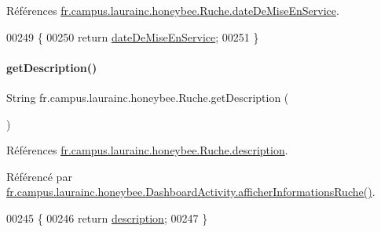 Références \hyperlink{classfr_1_1campus_1_1laurainc_1_1honeybee_1_1_ruche_aba813c622e2de609b22d7d752da2c544}{fr.\+campus.\+laurainc.\+honeybee.\+Ruche.\+date\+De\+Mise\+En\+Service}.


\begin{DoxyCode}
00249                                            \{
00250         \textcolor{keywordflow}{return} \hyperlink{classfr_1_1campus_1_1laurainc_1_1honeybee_1_1_ruche_aba813c622e2de609b22d7d752da2c544}{dateDeMiseEnService};
00251     \}
\end{DoxyCode}
\mbox{\label{classfr_1_1campus_1_1laurainc_1_1honeybee_1_1_ruche_ade21eb84d2a34d71cc2e89134b79cfd2}} 
\paragraph{\texorpdfstring{get\+Description()}{getDescription()}}
{\footnotesize\ttfamily String fr.\+campus.\+laurainc.\+honeybee.\+Ruche.\+get\+Description (\begin{DoxyParamCaption}{ }\end{DoxyParamCaption})}



Références \hyperlink{classfr_1_1campus_1_1laurainc_1_1honeybee_1_1_ruche_ae56a8481dac2ac5b127c0c9c62f00fe3}{fr.\+campus.\+laurainc.\+honeybee.\+Ruche.\+description}.



Référencé par \hyperlink{classfr_1_1campus_1_1laurainc_1_1honeybee_1_1_dashboard_activity_a88f00531bee33bd6c47b33f5ac4df9ed}{fr.\+campus.\+laurainc.\+honeybee.\+Dashboard\+Activity.\+afficher\+Informations\+Ruche()}.


\begin{DoxyCode}
00245                                    \{
00246         \textcolor{keywordflow}{return} \hyperlink{classfr_1_1campus_1_1laurainc_1_1honeybee_1_1_ruche_ae56a8481dac2ac5b127c0c9c62f00fe3}{description};
00247     \}
\end{DoxyCode}
\mbox{\label{classfr_1_1campus_1_1laurainc_1_1honeybee_1_1_ruche_a0cbf5aacc51f6a0fc5bd9def0f1a32c7}} 
